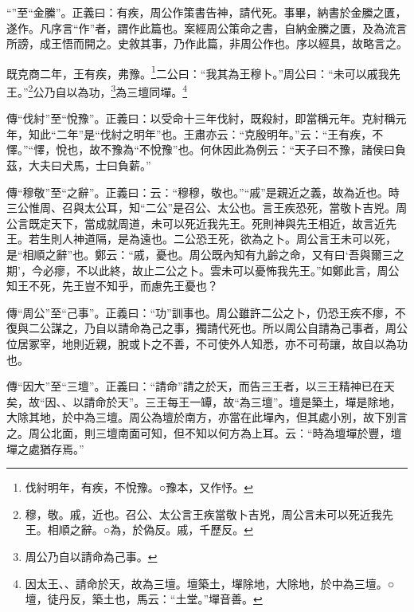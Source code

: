 {\noindent\shu{}\fzkt “”至“金縢”。正義曰：有疾，周公作策書告神，請代死。事畢，納書於金縢之匱，遂作。凡序言“作”者，謂作此篇也。案經周公策命之書，自納金縢之匱，及為流言所謗，成王悟而開之。史敘其事，乃作此篇，非周公作也。序以經具，故略言之。 \par}

既克商二年，王有疾，弗豫。\footnote{伐紂明年，有疾，不悅豫。○豫本，又作忬。}二公曰：“我其為王穆卜。”周公曰：“未可以戚我先王。”\footnote{穆，敬。戚，近也。召公、太公言王疾當敬卜吉兇，周公言未可以死近我先王。相順之辭。○為，於偽反。戚，千歷反。}公乃自以為功，\footnote{周公乃自以請命為己事。}為三壇同墠。\footnote{因太王、、請命於天，故為三壇。壇築土，墠除地，大除地，於中為三壇。○壇，徒丹反，築土也，馬云：“土堂。”墠音善。}

{\noindent\zhuan{}\fzbyks 傳“伐紂”至“悅豫”。正義曰：以受命十三年伐紂，既殺紂，即當稱元年。克紂稱元年，知此“二年”是“伐紂之明年”也。王肅亦云：“克殷明年。”云：“王有疾，不懌。”“懌，悅也，故不豫為“不悅豫”也。何休因此為例云：“天子曰不豫，諸侯曰負茲，大夫曰犬馬，士曰負薪。” \par}

{\noindent\zhuan{}\fzbyks 傳“穆敬”至“之辭”。正義曰：云：“穆穆，敬也。”“戚”是親近之義，故為近也。時三公惟周、召與太公耳，知“二公”是召公、太公也。言王疾恐死，當敬卜吉兇。周公言既定天下，當成就周道，未可以死近我先王。死則神與先王相近，故言近先王。若生則人神道隔，是為遠也。二公恐王死，欲為之卜。周公言王未可以死，是“相順之辭”也。鄭云：“戚，憂也。周公既內知有九齡之命，又有曰‘吾與爾三之期’，今必瘳，不以此終，故止二公之卜。雲未可以憂怖我先王。”如鄭此言，周公知王不死，先王豈不知乎，而慮先王憂也？ \par}

{\noindent\zhuan{}\fzbyks 傳“周公”至“己事”。正義曰：“功”訓事也。周公雖許二公之卜，仍恐王疾不瘳，不復與二公謀之，乃自以請命為己之事，獨請代死也。所以周公自請為己事者，周公位居冢宰，地則近親，脫或卜之不善，不可使外人知悉，亦不可苟讓，故自以為功也。 \par}

{\noindent\zhuan{}\fzbyks 傳“因大”至“三壇”。正義曰：“請命”請之於天，而告三王者，以三王精神已在天矣，故“因、、以請命於天”。三王每王一罈，故“為三壇”。壇是築土，墠是除地，大除其地，於中為三壇。周公為壇於南方，亦當在此墠內，但其處小別，故下別言之。周公北面，則三壇南面可知，但不知以何方為上耳。云：“時為壇墠於豐，壇墠之處猶存焉。” \par}

